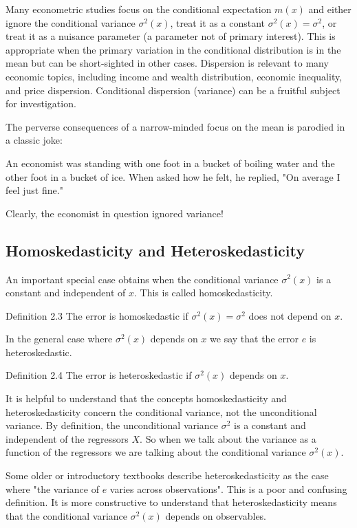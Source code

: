 \documentclass[10pt]{article}
\begin{document}
Many econometric studies focus on the conditional expectation $m(x)$ and either ignore the conditional variance $\sigma^{2}(x)$, treat it as a constant $\sigma^{2}(x)=\sigma^{2}$, or treat it as a nuisance parameter (a parameter not of primary interest). This is appropriate when the primary variation in the conditional distribution is in the mean but can be short-sighted in other cases. Dispersion is relevant to many economic topics, including income and wealth distribution, economic inequality, and price dispersion. Conditional dispersion (variance) can be a fruitful subject for investigation.

The perverse consequences of a narrow-minded focus on the mean is parodied in a classic joke:

An economist was standing with one foot in a bucket of boiling water and the other foot in a bucket of ice. When asked how he felt, he replied, "On average I feel just fine."

Clearly, the economist in question ignored variance!

\subsection{Homoskedasticity and Heteroskedasticity}
An important special case obtains when the conditional variance $\sigma^{2}(x)$ is a constant and independent of $x$. This is called homoskedasticity.

Definition 2.3 The error is homoskedastic if $\sigma^{2}(x)=\sigma^{2}$ does not depend on $x$.

In the general case where $\sigma^{2}(x)$ depends on $x$ we say that the error $e$ is heteroskedastic.

Definition 2.4 The error is heteroskedastic if $\sigma^{2}(x)$ depends on $x$.

It is helpful to understand that the concepts homoskedasticity and heteroskedasticity concern the conditional variance, not the unconditional variance. By definition, the unconditional variance $\sigma^{2}$ is a constant and independent of the regressors $X$. So when we talk about the variance as a function of the regressors we are talking about the conditional variance $\sigma^{2}(x)$.

Some older or introductory textbooks describe heteroskedasticity as the case where "the variance of $e$ varies across observations". This is a poor and confusing definition. It is more constructive to understand that heteroskedasticity means that the conditional variance $\sigma^{2}(x)$ depends on observables.
\end{document}
